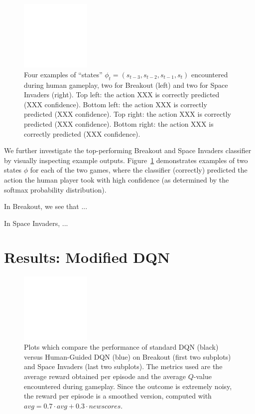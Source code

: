 \documentclass[letterpaper, 10pt, conference]{ieeeconf}
\begin{document}
\begin{figure}[t]
\centering
\includegraphics[width=0.30\textwidth]{figures/empty.png}
\caption{\footnotesize
Four examples of ``states'' $\phi_t = (s_{t-3},s_{t-2},s_{t-1},s_t)$ encountered
during human gameplay, two for Breakout (left) and two for Space Invaders
(right). Top left: the action XXX is correctly predicted (XXX confidence).
Bottom left: the action XXX is correctly predicted (XXX confidence). Top right:
the action XXX is correctly predicted (XXX confidence). Bottom right: the action
XXX is correctly predicted (XXX confidence).
}
\label{fig:example_game_frames}
\end{figure}

We further investigate the top-performing Breakout and Space Invaders classifier
by visually inspecting example outputs. Figure~\ref{fig:example_game_frames}
demonstrates examples of two states $\phi$ for each of the two games, where the
classifier (correctly) predicted the action the human player took with high
confidence (as determined by the softmax probability distribution).

In Breakout, we see that ...

In Space Invaders, ...




\section{Results: Modified DQN}\label{sec:results_p2}

\begin{figure}[t]
\centering
\includegraphics[width=0.30\textwidth]{figures/empty.png}
\caption{\footnotesize
Plots which compare the performance of standard DQN (black) versus Human-Guided
DQN (blue) on Breakout (first two subplots) and Space Invaders (last two
subplots). The metrics used are the average reward obtained per episode
and the average $Q$-value encountered during gameplay. Since the outcome is
extremely noisy, the reward per episode is a smoothed version, computed with
$avg = 0.7\cdot avg + 0.3\cdot newscores$.
}
\label{fig:human_dqn_performance}
\end{figure}
\end{document}
